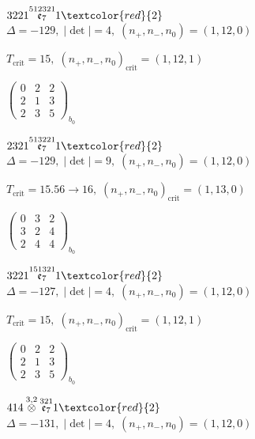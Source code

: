 \documentclass[10pt]{article}
\begin{document}
\smallskip

$3221\overset{512321}{\mathfrak{e}_7}1\textcolor{red}{2}$ \quad $\Delta=-129,\; |\det|=4,\; (n_+,n_-,n_0)=(1,12,0)$

\hspace{1em}$T_{\text{crit}}=15,\; (n_+,n_-,n_0)_{\text{crit}}=(1,12,1)$

\hspace{2em}$\left(\begin{smallmatrix}0 & 2 & 2 \\ 2 & 1 & 3 \\ 2 & 3 & 5\end{smallmatrix}\right)_{\!b_0}$

\smallskip

$2321\overset{513221}{\mathfrak{e}_7}1\textcolor{red}{2}$ \quad $\Delta=-129,\; |\det|=9,\; (n_+,n_-,n_0)=(1,12,0)$

\hspace{1em}$T_{\text{crit}}=15.56 \to 16,\; (n_+,n_-,n_0)_{\text{crit}}=(1,13,0)$

\hspace{2em}$\left(\begin{smallmatrix}0 & 3 & 2 \\ 3 & 2 & 4 \\ 2 & 4 & 4\end{smallmatrix}\right)_{\!b_0}$

\smallskip

$3221\overset{151321}{\mathfrak{e}_7}1\textcolor{red}{2}$ \quad $\Delta=-127,\; |\det|=4,\; (n_+,n_-,n_0)=(1,12,0)$

\hspace{1em}$T_{\text{crit}}=15,\; (n_+,n_-,n_0)_{\text{crit}}=(1,12,1)$

\hspace{2em}$\left(\begin{smallmatrix}0 & 2 & 2 \\ 2 & 1 & 3 \\ 2 & 3 & 5\end{smallmatrix}\right)_{\!b_0}$

\smallskip

$414\overset{3,2}{\otimes}\overset{321}{\mathfrak{e}_7}1\textcolor{red}{2}$ \quad $\Delta=-131,\; |\det|=4,\; (n_+,n_-,n_0)=(1,12,0)$
\end{document}
